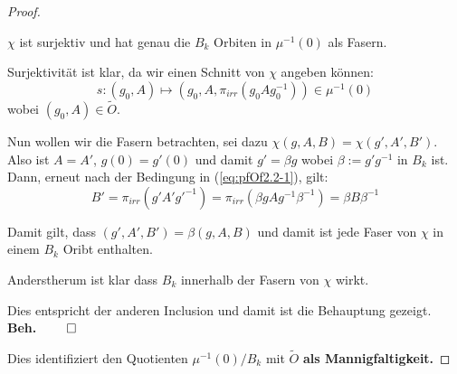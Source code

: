 \begin{proof}
\begin{comment}
  & \text{\color{red}so ist das falsch?!?}
\\&=g(0)g(0)^{-1}+g(0)(g_i)^{-1}\xi^1+\dots+g(0)(g_k)^{-1}\xi^k
\\&=1+g(0)(g_i)^{-1}\xi^1+\dots+g(0)(g_k)^{-1}\xi^k \in B_k
\end{align*}
ODER.
\[
(g(0))^{-1} \overset{\text{\color{red}?}}= g^{-1}(0)
\]
\end{comment}
\begin{beh}
$\chi$ ist surjektiv und hat genau die $B_k$ Orbiten in $\mu^{-1}(0)$ als
Fasern.
\end{beh}
Surjektivität ist klar, da wir einen Schnitt von $\chi$ angeben können:
\[
s:(g_0,A)\mapsto (g_0,A,\pi_{irr}(g_0Ag_0^{-1}))\in\mu^{-1}(0)
\]
wobei $(g_0,A)\in\tilde O$.
\begin{comment}
\[
\chi\circ s=\Big((g_0,A)\overset s\mapsto(g_0,A,\pi_{irr}(g_0Ag_0^{-1}))
  \overset\chi\mapsto(\underset{=g_0}{\underbrace{g_0(0)}},A)\Big)
  =\id_{\mu^{-1}(0)}
\]
\end{comment}
Nun wollen wir die Fasern betrachten, sei dazu $\chi(g,A,B)=\chi(g',A',B')$.
Also ist $A=A'$, $g(0)=g'(0)$ und damit $g'=\beta g$ wobei $\beta:=g'g^{-1}$ in
$B_k$ ist.
Dann, erneut nach der Bedingung in (\ref{eq:pfOf2.2-1}), gilt:
\[
B'=\pi_{irr}(g'A'g'^{-1})=\pi_{irr}(\beta gAg^{-1}\beta^{-1})=\beta B\beta^{-1}
\]
\begin{comment}
\begin{align*}
B'&\overset{(\ref{eq:pfOf2.2-1})}=
  \pi_{irr}(g'A'g'^{-1})  \overset{A'=A}{=}
    \pi_{irr}\left(g'\left(g^{-1}g\right)A\left(g^{-1}g\right)g'^{-1}\right)
    =\pi_{irr}(\beta gAg^{-1}\beta^{-1})
\\& =\beta \pi_{irr}(gAg^{-1}) \beta^{-1}
    \overset{(\ref{eq:pfOf2.2-1})}=\beta B\beta^{-1}
\end{align*}
\end{comment}
Damit gilt, dass $(g',A',B')=\beta(g,A,B)$ und damit ist jede Faser von $\chi$
in einem $B_k$ Oribt enthalten.
\begin{comment}
Also(?):
\begin{align*}
\beta(g,A,B)
  &\overset{!}=(\beta g,A,\beta B\beta^{-1})
\\&=(g',A',B')
\end{align*}
\end{comment}
Anderstherum ist klar dass $B_k$ innerhalb der Fasern von $\chi$ wirkt.
\begin{comment}
Wie sieht die $B_k$-Wirkung auf $\mu^{-1}(0)$ aus?
Sei $\beta\in B_k$ und $(g,A,B)\in\mu^{-1}(0)$ so \dots
\end{comment}
Dies entspricht der anderen Inclusion und damit ist die Behauptung gezeigt.
{\hfill \textbf{Beh.} \ensuremath{\qed}}

Dies identifiziert den Quotienten $\mu^{-1}(0)/B_k$ mit $\tilde O$ \textbf{als
Mannigfaltigkeit.}

\TODO
\end{proof}

